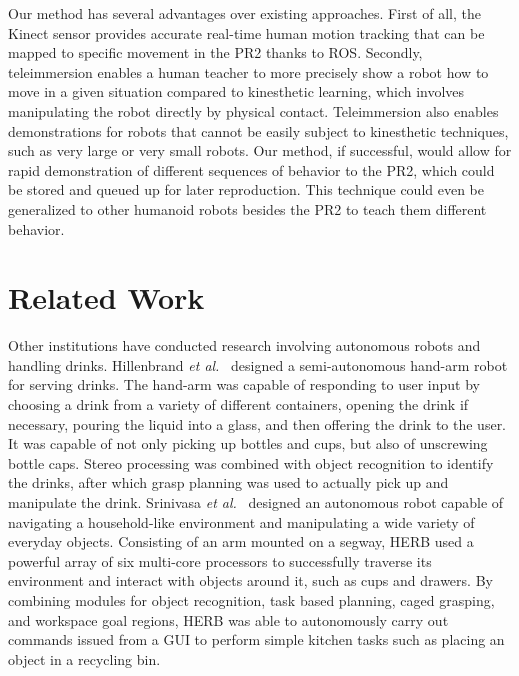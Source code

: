 \documentclass{sig-alternate}
\begin{document}
Our method has several advantages over existing approaches. First of all, the Kinect sensor provides accurate real-time human motion tracking that can be mapped to specific movement in the PR2 thanks to ROS. Secondly, teleimmersion enables a human teacher to more precisely show a robot how to move in a given situation compared to kinesthetic learning, which involves manipulating the robot directly by physical contact. Teleimmersion also enables demonstrations for robots that cannot be easily subject to kinesthetic techniques, such as very large or very small robots. Our method, if successful, would allow for rapid demonstration of different sequences of behavior to the PR2, which could be stored and queued up for later reproduction. This technique could even be generalized to other humanoid robots besides the PR2 to teach them different behavior.\\
	
\section{Related Work}
\label{sec:related_work}
Other institutions have conducted research involving autonomous robots and handling drinks. Hillenbrand \textit{et al.}~\cite{pouring_arm} designed a semi-autonomous hand-arm robot for serving drinks. The hand-arm was capable of responding to user input by choosing a drink from a variety of different containers, opening the drink if necessary, pouring the liquid into a glass, and then offering the drink to the user. It was capable of not only picking up bottles and cups, but also of unscrewing bottle caps. Stereo processing was combined with object recognition to identify the drinks, after which grasp planning was used to actually pick up and manipulate the drink. Srinivasa \textit{et al.}~\cite{herb} designed an autonomous robot capable of navigating a household-like environment and manipulating a wide variety of everyday objects. Consisting of an arm mounted on a segway, HERB used a powerful array of six multi-core processors to successfully traverse its environment and interact with objects around it, such as cups and drawers. By combining modules for object recognition, task based planning, caged grasping, and workspace goal regions, HERB was able to autonomously carry out commands issued from a GUI to perform simple kitchen tasks such as placing an object in a recycling bin.\\
\end{document}

